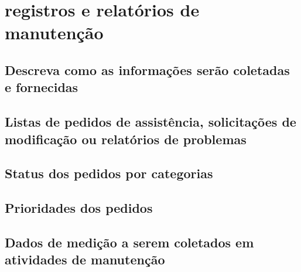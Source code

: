 \chapter{registros e relatórios de manutenção}

\section{Descreva como as informações serão coletadas e fornecidas}

\section{Listas de pedidos de assistência, solicitações de modificação ou relatórios de problemas}

\section{Status dos pedidos por categorias}

\section{Prioridades dos pedidos}

\section{Dados de medição a serem coletados em atividades de manutenção}